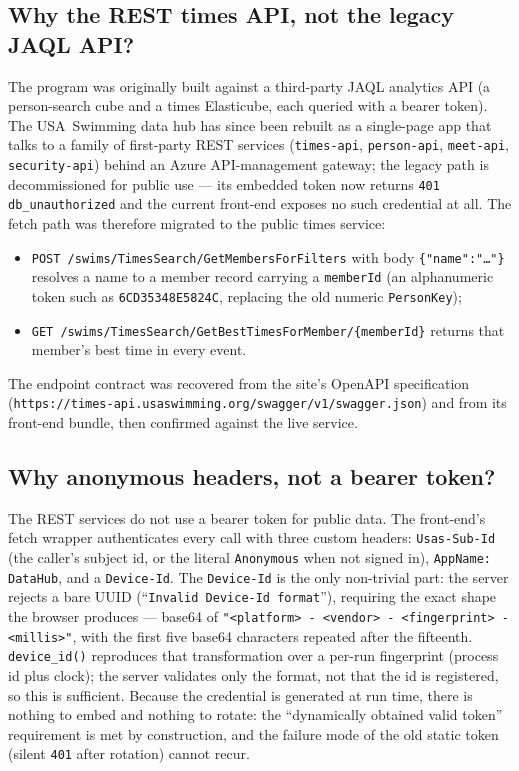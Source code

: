 \documentclass[12pt]{article}
\newcommand{\code}[1]{\texttt{#1}}
\begin{document}
\begin{description}[style=nextline]
\subsection{Why the REST times API, not the legacy JAQL API?}
\label{sec:why-rest}

The program was originally built against a third-party JAQL analytics
API (a person-search cube and a times Elasticube, each queried with a
bearer token).  The USA~Swimming
data hub has since been rebuilt as a single-page app that talks to a
family of first-party REST services
(\code{times-api}, \code{person-api}, \code{meet-api},
\code{security-api}) behind an Azure API-management gateway; the
legacy path is decommissioned for public use --- its embedded token
now returns \code{401 db\_unauthorized} and the current front-end
exposes no such credential at all.  The fetch path was therefore
migrated to the public times service:

\begin{itemize}
  \item \code{POST /swims/TimesSearch/GetMembersForFilters} with body
        \code{\{"name":"\dots"\}} resolves a name to a member record
        carrying a \code{memberId} (an alphanumeric token such as
        \code{6CD35348E5824C}, replacing the old numeric
        \code{PersonKey});
  \item \code{GET /swims/TimesSearch/GetBestTimesForMember/\{memberId\}}
        returns that member's best time in every event.
\end{itemize}

\noindent The endpoint contract was recovered from the site's
OpenAPI specification
(\code{https://times-api.usaswimming.org/swagger/v1/swagger.json})
and from its front-end bundle, then confirmed against the live service.

\subsection{Why anonymous headers, not a bearer token?}
\label{sec:why-anon}

The REST services do not use a bearer token for public data.  The
front-end's fetch wrapper authenticates every call with three custom
headers: \code{Usas-Sub-Id} (the caller's subject id, or the literal
\code{Anonymous} when not signed in), \code{AppName: DataHub}, and a
\code{Device-Id}.  The \code{Device-Id} is the only non-trivial part:
the server rejects a bare UUID (``\code{Invalid Device-Id format}''),
requiring the exact shape the browser produces --- base64 of
\code{"<platform> - <vendor> - <fingerprint> - <millis>"}, with the
first five base64 characters repeated after the fifteenth.
\code{device\_id()} reproduces that transformation over a per-run
fingerprint (process id plus clock); the server validates only the
format, not that the id is registered, so this is sufficient.  Because
the credential is generated at run time, there is nothing to embed and
nothing to rotate: the ``dynamically obtained valid token''
requirement is met by construction, and the failure mode of the old
static token (silent \code{401} after rotation) cannot recur.


\end{description}
\end{document}
